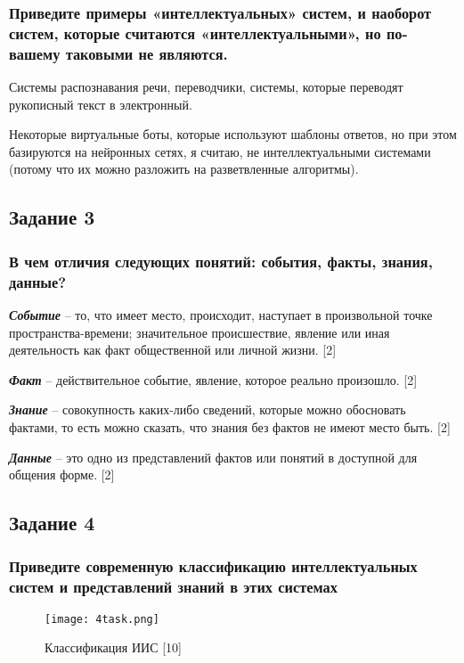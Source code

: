 \documentclass[14pt,a4paper,report]{report}
\begin{document}
\subsubsection{Приведите примеры «интеллектуальных» систем, и наоборот систем, которые считаются «интеллектуальными», но по-вашему таковыми не являются.}

Системы распознавания речи, переводчики, системы, которые переводят рукописный текст в электронный.

Некоторые виртуальные боты, которые используют шаблоны ответов, но при этом базируются на нейронных сетях, я считаю, не интеллектуальными системами (потому что их можно разложить на разветвленные алгоритмы).

\subsection{Задание 3}

\subsubsection{В чем отличия следующих понятий: события, факты, знания, данные?}

\emph{\textbf{Событие}} -- то, что имеет место, происходит, наступает в произвольной точке пространства-времени; значительное происшествие, явление или иная деятельность как факт общественной или личной жизни. [2]

\emph{\textbf{Факт}} -- действительное событие, явление, которое реально произошло. [2]

\emph{\textbf{Знание}} -- совокупность каких-либо сведений, которые можно обосновать фактами, то есть можно сказать, что знания без фактов не имеют место быть. [2]

\emph{\textbf{Данные}} -- это одно из представлений фактов или понятий в доступной для общения форме. [2]

\newpage
\subsection{Задание 4}

\subsubsection{Приведите современную классификацию интеллектуальных систем и представлений знаний в этих системах}

\begin{figure}[h!]
	\centering
	\texttt{[image: 4task.png]}
	\caption{Классификация ИИС [10]}
	\label{image:1}
\end{figure}	
\end{document}
